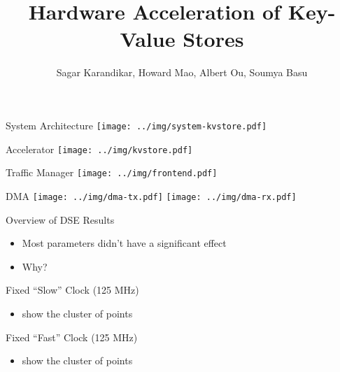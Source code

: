 \documentclass{beamer}
\title{Hardware Acceleration of Key-Value Stores}
\author{Sagar Karandikar, Howard Mao, Albert Ou, Soumya Basu}
\institute[UC Berkeley]{\textsc{University of California, Berkeley}}
\begin{document}
\frame{\titlepage}

\begin{frame}
    
\end{frame}

\begin{frame}{System Architecture}
    \texttt{[image: ../img/system-kvstore.pdf]}
\end{frame}

\begin{frame}{Accelerator}
    \texttt{[image: ../img/kvstore.pdf]}
\end{frame}

\begin{frame}{Traffic Manager}
    \texttt{[image: ../img/frontend.pdf]}
\end{frame}

\begin{frame}{DMA}
    \texttt{[image: ../img/dma-tx.pdf]}
    \texttt{[image: ../img/dma-rx.pdf]}
\end{frame}

\begin{frame}
    
\end{frame}

\begin{frame}{Overview of DSE Results}
    \begin{itemize}
        \item Most parameters didn't have a significant effect
        \item Why?
    \end{itemize}
\end{frame}


\begin{frame}{Fixed ``Slow'' Clock (125 MHz)}
    \begin{itemize}
        \item show the cluster of points
    \end{itemize}
\end{frame}


\begin{frame}{Fixed ``Fast'' Clock (125 MHz)}
    \begin{itemize}
        \item show the cluster of points
    \end{itemize}
\end{frame}





\begin{frame}

    
\end{frame}
\end{document}
